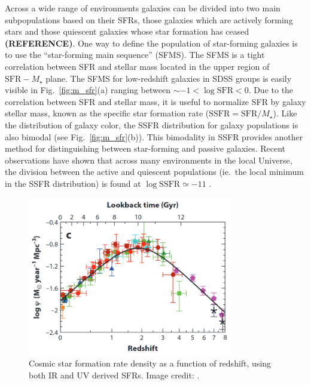Across a wide range of environments galaxies
can be divided into two main subpopulations based on their SFRs, those
galaxies which are actively forming stars and those quiescent galaxies
whose star formation has ceased \textbf{(REFERENCE)}.  One way to
define the population of star-forming galaxies is to use the
``star-forming main sequence'' (SFMS).  The SFMS is a tight
correlation between SFR and stellar mass located in the upper region
of $\mathrm{SFR} - M_\star$ plane.  The SFMS for low-redshift galaxies
in SDSS groups is easily visible in Fig.~\ref{fig:m_sfr}(a) ranging
between $\sim -1 < \log \mathrm{SFR} < 0$.  Due to the correlation
between SFR and stellar mass, it is useful to normalize SFR by galaxy
stellar mass, known as the specific star formation rate
($\mathrm{SSFR} = \mathrm{SFR}/M_\star$).  Like the distribution of
galaxy color, the SSFR distribution for galaxy populations is also
bimodal (see Fig.~\ref{fig:m_sfr}(b)).  This bimodality in SSFR
provides another method for distinguishing between star-forming and
passive galaxies.  Recent observations have shown that across
many environments in the local Universe, the division between
the active and quiescent populations (ie.\ the local minimum in the
SSFR distribution) is found at $\log \mathrm{SSFR} \simeq -11$
\citep{wetzel2012}.

\begin{figure}[!ht]
  \centering
  \includegraphics[width=0.8\textwidth]{lilly_madau.png}
  \caption{Cosmic star formation rate density as a function of
    redshift, using both IR and UV derived SFRs.  Image credit:
    \citet{madau2014}.}
  \label{fig:lilly_madau}
\end{figure}

